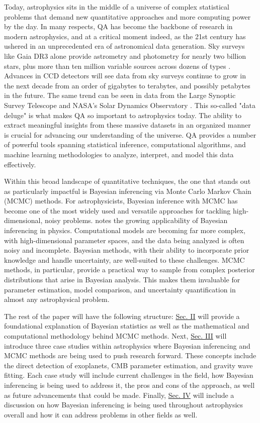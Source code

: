 \documentclass[twocolumn,linenumbers]{aastex631}
\begin{document}
Today, astrophysics sits in the middle of a universe of complex statistical problems that demand new quantitative approaches and more computing power by the day. In many respects, QA has become the backbone of research in modern astrophysics, and at a critical moment indeed, as the 21st century has ushered in an unprecedented era of astronomical data generation. Sky surveys like  Gaia DR3 alone provide astrometry and photometry for nearly two billion stars, plus more than ten million variable sources across dozens of types \citep{gaiacollaborationGaiaDataRelease2023}. Advances in CCD detectors will see data from sky surveys continue to grow in the next decade from an order of gigabytes to terabytes, and possibly petabytes in the future. The same trend can be seen in data from the Large Synoptic Survey Telescope and NASA's Solar Dynamics Observatory \citep{borneAstroinformatics21stCentury2009}. This so-called "data deluge" is what makes QA so important to astrophysics today. The ability to extract meaningful insights from these massive datasets in an organized manner is crucial for advancing our understanding of the universe. QA provides a number of powerful tools spanning statistical inference, computational algorithms, and machine learning methodologies to analyze, interpret, and model this data effectively.

Within this broad landscape of quantitative techniques, the one that stands out as particularly impactful is Bayesian inferencing via Monte Carlo Markov Chain (MCMC) methods. For astrophysicists, Bayesian inference with MCMC has become one of the most widely used and versatile approaches for tackling high-dimensional, noisy problems. \citet{vontoussaintBayesianInferencePhysics2011} notes the growing applicability of Bayesian inferencing in physics. Computational models are becoming far more complex, with high-dimensional parameter spaces, and the data being analyzed is often noisy and incomplete. Bayesian methods, with their ability to incorporate prior knowledge and handle uncertainty, are well-suited to these challenges. MCMC methods, in particular, provide a practical way to sample from complex posterior distributions that arise in Bayesian analysis. This makes them invaluable for parameter estimation, model comparison, and uncertainty quantification in almost any astrophysical problem.

The rest of the paper will have the following structure: \hyperref[placeholder]{Sec. II} will provide a foundational explanation of Bayesian statistics as well as the mathematical and computational methodology behind MCMC methods. Next, \hyperref[placeholder]{Sec. III} will introduce three case studies within astrophysics where Bayesian inferencing and MCMC methods are being used to push research forward. These concepts include the direct detection of exoplanets, CMB parameter estimation, and gravity wave fitting. Each case study will include current challenges in the field, how Bayesian inferencing is being used to address it, the pros and cons of the approach, as well as future advancements that could be made. Finally, \hyperref[placeholder]{Sec. IV} will include a discussion on how Bayesian inferencing is being used throughout astrophysics overall and how it can address problems in other fields as well.


\end{document}
